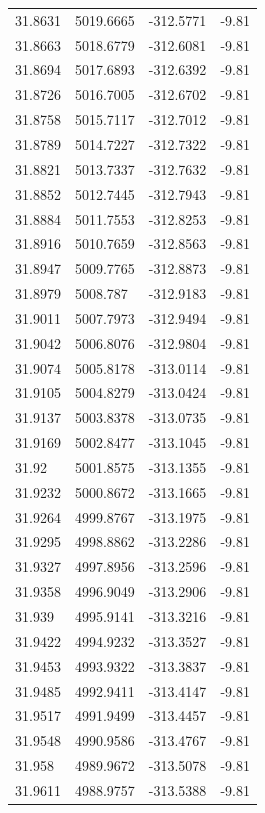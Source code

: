 \begin{table}[H]
\begin{tabular}{llll}
31.8631 & 5019.6665 & -312.5771 & -9.81 \\
31.8663 & 5018.6779 & -312.6081 & -9.81 \\
31.8694 & 5017.6893 & -312.6392 & -9.81 \\
31.8726 & 5016.7005 & -312.6702 & -9.81 \\
31.8758 & 5015.7117 & -312.7012 & -9.81 \\
31.8789 & 5014.7227 & -312.7322 & -9.81 \\
31.8821 & 5013.7337 & -312.7632 & -9.81 \\
31.8852 & 5012.7445 & -312.7943 & -9.81 \\
31.8884 & 5011.7553 & -312.8253 & -9.81 \\
31.8916 & 5010.7659 & -312.8563 & -9.81 \\
31.8947 & 5009.7765 & -312.8873 & -9.81 \\
31.8979 & 5008.787 & -312.9183 & -9.81 \\
31.9011 & 5007.7973 & -312.9494 & -9.81 \\
31.9042 & 5006.8076 & -312.9804 & -9.81 \\
31.9074 & 5005.8178 & -313.0114 & -9.81 \\
31.9105 & 5004.8279 & -313.0424 & -9.81 \\
31.9137 & 5003.8378 & -313.0735 & -9.81 \\
31.9169 & 5002.8477 & -313.1045 & -9.81 \\
31.92 & 5001.8575 & -313.1355 & -9.81 \\
31.9232 & 5000.8672 & -313.1665 & -9.81 \\
31.9264 & 4999.8767 & -313.1975 & -9.81 \\
31.9295 & 4998.8862 & -313.2286 & -9.81 \\
31.9327 & 4997.8956 & -313.2596 & -9.81 \\
31.9358 & 4996.9049 & -313.2906 & -9.81 \\
31.939 & 4995.9141 & -313.3216 & -9.81 \\
31.9422 & 4994.9232 & -313.3527 & -9.81 \\
31.9453 & 4993.9322 & -313.3837 & -9.81 \\
31.9485 & 4992.9411 & -313.4147 & -9.81 \\
31.9517 & 4991.9499 & -313.4457 & -9.81 \\
31.9548 & 4990.9586 & -313.4767 & -9.81 \\
31.958 & 4989.9672 & -313.5078 & -9.81 \\
31.9611 & 4988.9757 & -313.5388 & -9.81 \\

\end{tabular}
\end{table}
